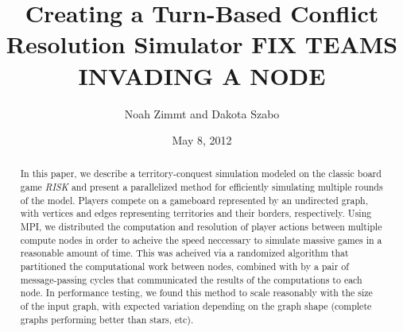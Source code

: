 \documentclass[10pt]{article}
\title{
	\textbf{
		Creating a Turn-Based Conflict Resolution Simulator FIX TEAMS INVADING A NODE
	}
}
\author{Noah Zimmt and Dakota Szabo}
\date{May 8, 2012}
\begin{document}
	\maketitle
	\begin{abstract}
		In this paper, we describe a territory-conquest simulation modeled on the classic board game \emph{RISK} and present a parallelized method for efficiently simulating multiple rounds of the model. 
		Players compete on a gameboard represented by an undirected graph, with vertices and edges representing territories and their borders, respectively. 
		Using MPI, we distributed the computation and resolution of player actions between multiple compute nodes in order to acheive the speed neccessary to simulate massive games in a reasonable amount of time. 
		This was acheived via a randomized algorithm that partitioned the computational work between nodes, combined with by a pair of message-passing cycles that communicated the results of the computations to each node. 
		In performance testing, we found this method to scale reasonably with the size of the input graph, with expected variation depending on the graph shape (complete graphs performing better than stars, etc).
	\end{abstract}
\end{document}
